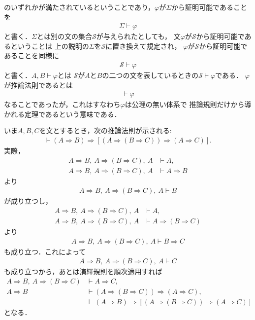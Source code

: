 	のいずれかが満たされているということであり，$\varphi$が$\Sigma$から証明可能であることを
	\begin{align}
		\Sigma \vdash \varphi
	\end{align}
	と書く．$\Sigma$とは別の文の集合$\mathscr{S}$が与えられたとしても，
	文$\varphi$が$\mathscr{S}$から証明可能であるということは
	上の説明の$\Sigma$を$\mathscr{S}$に置き換えて規定され，
	$\varphi$が$\mathscr{S}$から証明可能であることを同様に
	\begin{align}
		\mathscr{S} \vdash \varphi
	\end{align}
	と書く．$A,B \vdash \varphi$とは
	$\mathscr{S}$が$A$と$B$の二つの文を表しているときの$\mathscr{S} \vdash \varphi$である．
	$\varphi$が推論法則であるとは
	\begin{align}
		\vdash \varphi
	\end{align}
	なることであったが，これはすなわち$\varphi$は公理の無い体系で
	推論規則だけから導かれる定理であるという意味である．
	
	いま$A,B,C$を文とするとき，次の推論法則が示される:
	\begin{align}
		\vdash (A \Longrightarrow B) \Longrightarrow [(A \Longrightarrow (
		B \Longrightarrow C)) \Longrightarrow (A \Longrightarrow C)].
		\label{lemma_for_the_deduction_theorem}
	\end{align}
	実際，
	\begin{align}
		A \Longrightarrow B,\ A \Longrightarrow (B \Longrightarrow C),\ A
		&\vdash A, \\
		A \Longrightarrow B,\ A \Longrightarrow (B \Longrightarrow C),\ A
		&\vdash A \Longrightarrow B
	\end{align}
	より
	\begin{align}
		A \Longrightarrow B,\ A \Longrightarrow (B \Longrightarrow C),\ A
		\vdash B
	\end{align}
	が成り立つし，
	\begin{align}
		A \Longrightarrow B,\ A \Longrightarrow (B \Longrightarrow C),\ A
		&\vdash A, \\
		A \Longrightarrow B,\ A \Longrightarrow (B \Longrightarrow C),\ A
		&\vdash A \Longrightarrow (B \Longrightarrow C)
	\end{align}
	より
	\begin{align}
		A \Longrightarrow B,\ A \Longrightarrow (B \Longrightarrow C),\ A
		\vdash B \Longrightarrow C
	\end{align}
	も成り立つ．これによって
	\begin{align}
		A \Longrightarrow B,\ A \Longrightarrow (B \Longrightarrow C),\ A
		\vdash C
	\end{align}
	も成り立つから，あとは演繹規則を順次適用すれば
	\begin{align}
		A \Longrightarrow B,\ A \Longrightarrow (B \Longrightarrow C)
		&\vdash A \Longrightarrow C, \\
		A \Longrightarrow B
		&\vdash (A \Longrightarrow (B \Longrightarrow C)) \Longrightarrow
		(A \Longrightarrow C), \\
		&\vdash (A \Longrightarrow B) \Longrightarrow [(A \Longrightarrow (
		B \Longrightarrow C)) \Longrightarrow (A \Longrightarrow C)]
	\end{align}
	となる．
	
